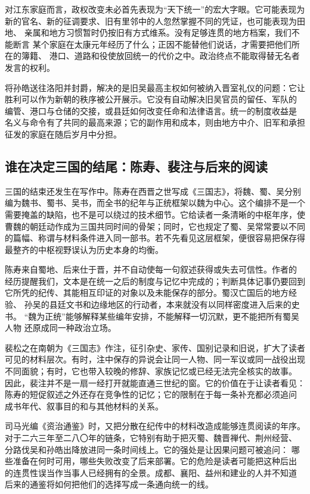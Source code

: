 对江东家庭而言，政权改变未必首先表现为“天下统一”的宏大字眼。它可能表现为
新的官名、新的征调要求、旧有里邻中的人忽然掌握不同的凭证，也可能表现为田地、
亲属和地方习惯暂时仍按旧有方式维系。没有足够连贯的地方档案，我们不能断言
某个家庭在太康元年经历了什么；正因不能替他们说话，才需要把他们所在的簿籍、
港口、道路和役使放回统一的代价之中。政治终点不能取得替无名者发言的权利。

\begin{turningpoint}
将孙皓送往洛阳并封爵，解决的是旧吴最高主权如何被纳入晋室礼仪的问题：它让
胜利可以作为新朝的秩序被公开展示。它没有自动解决旧吴官员的留任、军队的
编管、港口与仓储的交接，或县廷如何改变任命和法律语言。统一的制度收益是
名义与命令有了共同的最高来源；它的副作用和成本，则由地方中介、旧军和承担
征发的家庭在随后岁月中分担。
\end{turningpoint}

\subsection{谁在决定三国的结尾：陈寿、裴注与后来的阅读}

三国的结束还发生在写作中。陈寿在西晋之世写成《三国志》，将魏、蜀、吴分别
编为魏书、蜀书、吴书，而全书的纪年与正统框架以魏为中心。这个编排不是一个
需要掩盖的缺陷，也不是可以绕过的技术细节。它给读者一条清晰的中枢年序，使
曹魏的朝廷动作成为三国共同时间的骨架；同时，它也规定了蜀、吴常常要以不同
的篇幅、称谓与材料条件进入同一部书。若不先看见这层框架，便很容易把保存得
最整齐的中枢视野误认为历史本身的均衡。

陈寿来自蜀地、后来仕于晋，并不自动使每一句叙述获得或失去可信性。作者的
经历提醒我们，文本是在统一之后的制度与记忆中完成的；判断具体记事仍要回到
它所凭的纪传、其能相互印证的对象以及未能保存的部分。蜀汉亡国后的地方经验、
孙吴的县廷文书和边缘地区的行动者，本来就没有以同样密度进入后来的史书。
“魏为正统”能够解释某些编年安排，不能解释一切沉默，更不能把所有蜀吴人物
还原成同一种政治立场。

裴松之在南朝为《三国志》作注，征引杂史、家传、国别记录和旧说，扩大了读者
可见的材料层次。有时，注中保存的异说会让同一人物、同一军议或同一战役出现
不同面貌；有时，它也带入较晚的修辞、家族记忆或已经无法完全核实的故事。
因此，裴注并不是一扇一经打开就能直通三世纪的窗。它的价值在于让读者看见：
陈寿的短促叙述之外还存在竞争性的记忆；它的限制在于每一条补充都必须追问
成书年代、叙事目的和与其他材料的关系。

司马光编《资治通鉴》时，又把分散在纪传中的材料改造成能够连贯阅读的年序。
对于二六三年至二八〇年的链条，它特别有助于把灭蜀、魏晋禅代、荆州经营、
分路伐吴和孙皓出降放进同一条时间线上。它的强处是让因果问题可被追问：
哪些准备在何时可用，哪些失败改变了后来部署。它的危险是读者可能把这种后出
的连贯性误当作当事人已经拥有的全景。成都、襄阳、益州和建业的人并不知道
后来的通鉴将如何把他们的选择写成一条通向统一的线。

